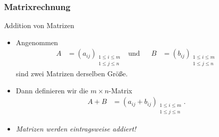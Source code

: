 \documentclass{beamer}
\renewcommand{\emph}[1]{{\textcolor{solarizedRed}{\itshape #1}}}
\renewcommand{\oe}{\"o}
\newcommand{\mytitle}{Matrixrechnung}
\begin{document}
\begin{frame}\frametitle{\mytitle}
	\begin{block}{Addition von Matrizen}
		\begin{itemize}
			\item Angenommen \begin{align*}
					A&=(a_{ij})_{\substack{1\leq i\leq m\\1\leq j\leq n}}&
					\mbox{und}&&
					B&=(b_{ij})_{\substack{1\leq i\leq m\\1\leq j\leq n}}
			\end{align*}
				sind zwei Matrizen derselben Gr\oe\ss e.
			\item Dann definieren wir die $m\times n$-Matrix
				\begin{align*}
					A+B&=(a_{ij}+b_{ij})_{\substack{1\leq i\leq m\\1\leq j\leq n}}.
				\end{align*}
			\item \emph{Matrizen werden eintragsweise addiert!}
		\end{itemize}
	\end{block}
\end{frame}
\end{document}
